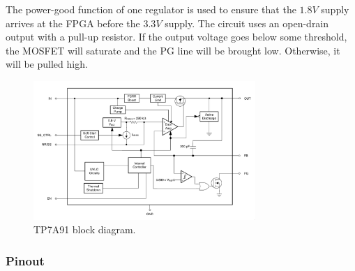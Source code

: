The power-good function of one regulator is used to ensure that the $1.8 \si{V}$ supply arrives at
the FPGA before the $3.3 \si{V}$ supply. The circuit uses an open-drain output with a pull-up
resistor. If the output voltage goes below some threshold, the MOSFET will saturate and the PG line
will be brought low. Otherwise, it will be pulled high.

\begin{figure}[h]
        \centering
        \includegraphics[width=0.75\textwidth]{data/tps7a91-block-diagram}
        \caption{TP7A91 block diagram.}
        \label{fig:tps7a91-block-diagram}
\end{figure}

\subsubsection{Pinout}
\label{sec:tps7a91-pinout}

